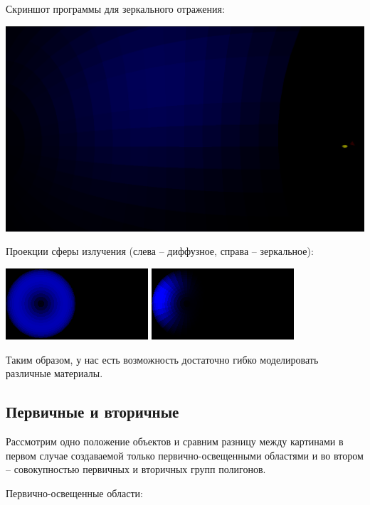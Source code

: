 Скриншот программы для зеркального отражения:

\includegraphics[width=1\linewidth]{zerkalo-screen.png}

Проекции сферы излучения (слева -- диффузное, справа -- зеркальное):

\includegraphics[width=0.499\linewidth]{lambert-map.png}
\includegraphics[width=0.499\linewidth]{zerkalo-map.png}

Таким образом, у нас есть возможность достаточно гибко моделировать различные материалы. 

\subsection*{Первичные и вторичные}

Рассмотрим одно положение объектов и сравним разницу между картинами в первом случае создаваемой только первично-освещенными областями и во втором -- совокупностью первичных и вторичных групп полигонов. 

Первично-освещенные области:

